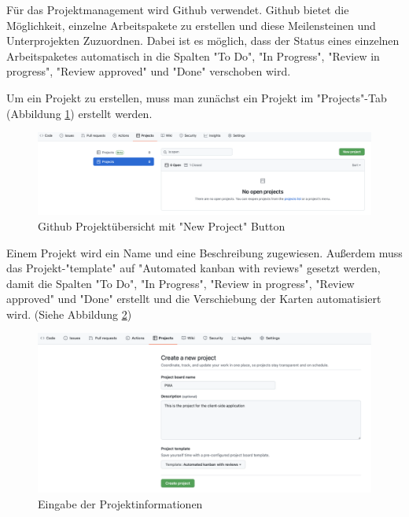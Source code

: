 
Für das Projektmanagement wird Github verwendet. Github bietet die Möglichkeit, einzelne Arbeitspakete zu erstellen und diese Meilensteinen und Unterprojekten Zuzuordnen. Dabei ist es möglich, dass der Status eines einzelnen Arbeitspaketes automatisch in die Spalten "To Do", "In Progress", "Review in progress", "Review approved" und "Done" verschoben wird.


Um ein Projekt zu erstellen, muss man zunächst ein Projekt im "Projects"-Tab (Abbildung \ref{fig:newProject}) erstellt werden.

\begin{figure}[H]
    \centering
    \includegraphics[width=\textwidth]{media/ProjectManagement/CreateProject.png}
    \caption{Github Projektübersicht mit "New Project" Button}
    \label{fig:newProject}
\end{figure}

Einem Projekt wird ein Name und eine Beschreibung zugewiesen. Außerdem muss das Projekt-"template" auf "Automated kanban with reviews" gesetzt werden, damit die Spalten "To Do", "In Progress", "Review in progress", "Review approved" und "Done" erstellt und die Verschiebung der Karten automatisiert wird. (Siehe Abbildung \ref{fig:enterProjectInfo})

\begin{figure}[H]
    \centering
    \includegraphics[width=\textwidth]{media/ProjectManagement/EnterProjectInfo.png}
    \caption{Eingabe der Projektinformationen}
    \label{fig:enterProjectInfo}
\end{figure}

